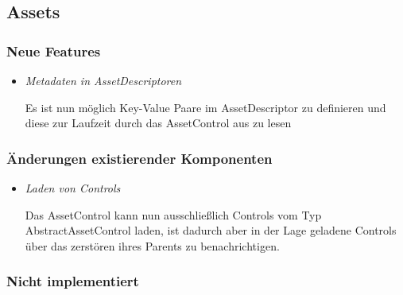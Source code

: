 \subsection{Assets}

\subsubsection{Neue Features}
\begin{itemize}
    \item \textit{Metadaten in AssetDescriptoren}
        \begin{leftbar}[0.9\linewidth]
            Es ist nun möglich Key-Value Paare im AssetDescriptor zu definieren und diese
            zur Laufzeit durch das AssetControl aus zu lesen
        \end{leftbar}
\end{itemize}

\subsubsection{Änderungen existierender Komponenten}
\begin{itemize}
    \item \textit{Laden von Controls}
        \begin{leftbar}[0.9\linewidth]
            Das AssetControl kann nun ausschließlich Controls vom Typ AbstractAssetControl laden,
            ist dadurch aber in der Lage geladene Controls über das zerstören ihres Parents zu benachrichtigen.
        \end{leftbar}
\end{itemize}
\subsubsection{Nicht implementiert}